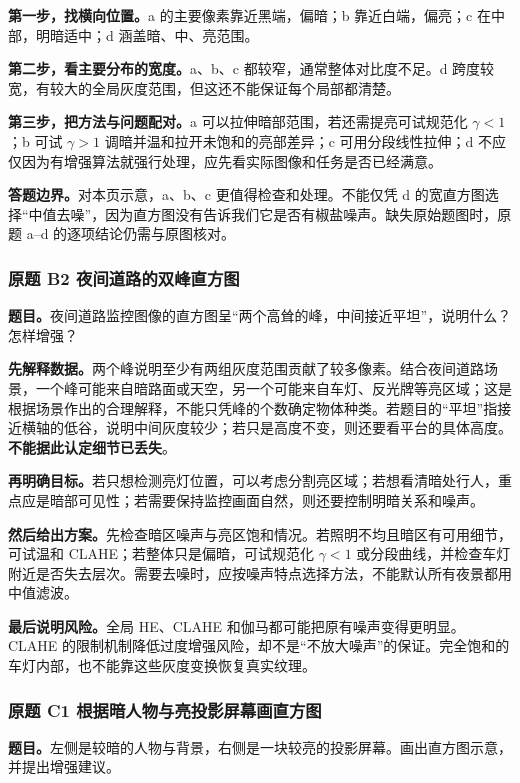 \textbf{第一步，找横向位置。}a 的主要像素靠近黑端，偏暗；b 靠近白端，偏亮；c 在中部，明暗适中；d 涵盖暗、中、亮范围。

\textbf{第二步，看主要分布的宽度。}a、b、c 都较窄，通常整体对比度不足。d 跨度较宽，有较大的全局灰度范围，但这还不能保证每个局部都清楚。

\textbf{第三步，把方法与问题配对。}a 可以拉伸暗部范围，若还需提亮可试规范化 $\gamma<1$；b 可试 $\gamma>1$ 调暗并温和拉开未饱和的亮部差异；c 可用分段线性拉伸；d 不应仅因为有增强算法就强行处理，应先看实际图像和任务是否已经满意。

\textbf{答题边界。}对本页示意，a、b、c 更值得检查和处理。不能仅凭 d 的宽直方图选择“中值去噪”，因为直方图没有告诉我们它是否有椒盐噪声。缺失原始题图时，原题 a--d 的逐项结论仍需与原图核对。

\subsubsection*{原题 B2 夜间道路的双峰直方图}
\label{original:B2}

\textbf{题目。}夜间道路监控图像的直方图呈“两个高耸的峰，中间接近平坦”，说明什么？怎样增强？

\textbf{先解释数据。}两个峰说明至少有两组灰度范围贡献了较多像素。结合夜间道路场景，一个峰可能来自暗路面或天空，另一个可能来自车灯、反光牌等亮区域；这是根据场景作出的合理解释，不能只凭峰的个数确定物体种类。若题目的“平坦”指接近横轴的低谷，说明中间灰度较少；若只是高度不变，则还要看平台的具体高度。\textbf{不能据此认定细节已丢失}。

\textbf{再明确目标。}若只想检测亮灯位置，可以考虑分割亮区域；若想看清暗处行人，重点应是暗部可见性；若需要保持监控画面自然，则还要控制明暗关系和噪声。

\textbf{然后给出方案。}先检查暗区噪声与亮区饱和情况。若照明不均且暗区有可用细节，可试温和 CLAHE；若整体只是偏暗，可试规范化 $\gamma<1$ 或分段曲线，并检查车灯附近是否失去层次。需要去噪时，应按噪声特点选择方法，不能默认所有夜景都用中值滤波。

\textbf{最后说明风险。}全局 HE、CLAHE 和伽马都可能把原有噪声变得更明显。CLAHE 的限制机制降低过度增强风险，却不是“不放大噪声”的保证。完全饱和的车灯内部，也不能靠这些灰度变换恢复真实纹理。

\subsubsection*{原题 C1 根据暗人物与亮投影屏幕画直方图}
\label{original:C1}

\textbf{题目。}左侧是较暗的人物与背景，右侧是一块较亮的投影屏幕。画出直方图示意，并提出增强建议。

